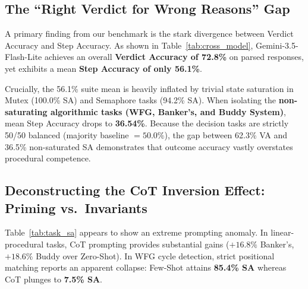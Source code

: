 \documentclass[conference]{IEEEtran}
\begin{document}
\subsection{The ``Right Verdict for Wrong Reasons'' Gap}

A primary finding from our benchmark is the stark divergence between Verdict Accuracy and
Step Accuracy. As shown in Table~\ref{tab:cross_model}, Gemini-3.5-Flash-Lite achieves an
overall \textbf{Verdict Accuracy of 72.8\%} on parsed responses, yet exhibits a mean
\textbf{Step Accuracy of only 56.1\%}.

Crucially, the 56.1\% suite mean is heavily inflated by trivial state saturation in
Mutex (100.0\% SA) and Semaphore tasks (94.2\% SA). When isolating the \textbf{non-saturating
algorithmic tasks (WFG, Banker's, and Buddy System)}, mean Step Accuracy drops to
\textbf{36.54\%}. Because the decision tasks are strictly 50/50 balanced (majority
baseline $= 50.0\%$), the gap between 62.3\% VA and 36.5\% non-saturated SA demonstrates
that outcome accuracy vastly overstates procedural competence.

\subsection{Deconstructing the CoT Inversion Effect: Priming vs.\ Invariants}

Table~\ref{tab:task_sa} appears to show an extreme prompting anomaly. In linear-procedural
tasks, CoT prompting provides substantial gains ($+16.8\%$ Banker's, $+18.6\%$ Buddy
over Zero-Shot). In WFG cycle detection, strict positional matching reports an apparent
collapse: Few-Shot attains \textbf{85.4\% SA} whereas CoT plunges to \textbf{7.5\% SA}.
\end{document}
